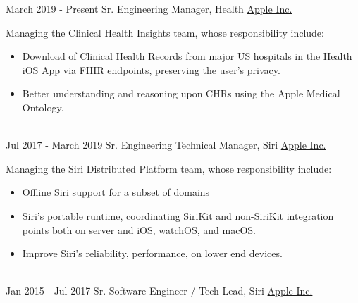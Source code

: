 \documentclass[letterpaper]{twentysecondcv} %
\begin{document}
\makeprofile %


\vspace{0.3cm}

\begin{twenty} %
    \twentyitem
        {March 2019 -}
        {Present}
        {Sr. Engineering Manager, Health}
        {\href{http://www.apple.com/}{Apple Inc.}}
        {Managing the Clinical Health Insights team, whose responsibility include:
        {\begin{itemize}
        \item Download of Clinical Health Records from major US hospitals in the Health iOS App via FHIR endpoints, preserving the user's privacy.
        \item Better understanding and reasoning upon CHRs using the Apple Medical Ontology.
        \end{itemize}}
        }
        {}
     \\
    \twentyitem
        {Jul 2017 -}
        {March 2019}
        {Sr. Engineering Technical Manager, Siri}
        {\href{http://www.apple.com}{Apple Inc.}}
        {Managing the Siri Distributed Platform team, whose responsibility include:
        {\begin{itemize}
        \item Offline Siri support for a subset of domains
        \item Siri's portable runtime, coordinating SiriKit and non-SiriKit integration points both on server and iOS, watchOS, and macOS.
        \item Improve Siri's reliability, performance, on lower end devices.
        \end{itemize}}
        }
        {}
    \\
    \twentyitem
        {Jan 2015 -}
        {Jul 2017}
        {Sr. Software Engineer / Tech Lead, Siri}
        {\href{http://www.apple.com}{Apple Inc.}}

\end{twenty}
\end{document}
